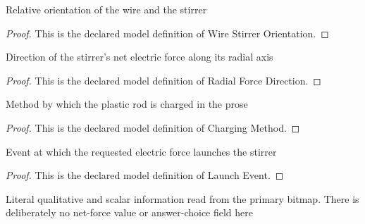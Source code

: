 \begin{definition}
  \label{def:physics:phyx-mini-0839:phyxminiproblems-problemphyxmini0839-wirestirrerorientation}
  Relative orientation of the wire and the stirrer
\end{definition}
\begin{proof}
  This is the declared model definition of Wire Stirrer Orientation.
\end{proof}
\begin{definition}
  \label{def:physics:phyx-mini-0839:phyxminiproblems-problemphyxmini0839-radialforcedirection}
  Direction of the stirrer's net electric force along its radial axis
\end{definition}
\begin{proof}
  This is the declared model definition of Radial Force Direction.
\end{proof}
\begin{definition}
  \label{def:physics:phyx-mini-0839:phyxminiproblems-problemphyxmini0839-chargingmethod}
  Method by which the plastic rod is charged in the prose
\end{definition}
\begin{proof}
  This is the declared model definition of Charging Method.
\end{proof}
\begin{definition}
  \label{def:physics:phyx-mini-0839:phyxminiproblems-problemphyxmini0839-launchevent}
  Event at which the requested electric force launches the stirrer
\end{definition}
\begin{proof}
  This is the declared model definition of Launch Event.
\end{proof}
\begin{definition}
  \label{def:physics:phyx-mini-0839:phyxminiproblems-problemphyxmini0839-chargedstirrerfigure}
  Literal qualitative and scalar information read from the primary bitmap. There is deliberately no net-force value or answer-choice field here
\end{definition}
